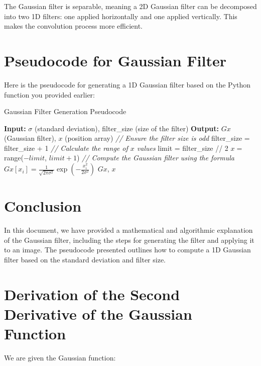 \documentclass{article}
\begin{document}
The Gaussian filter is separable, meaning a 2D Gaussian filter can be decomposed into two 1D filters: one applied horizontally and one applied vertically. This makes the convolution process more efficient.

\section{Pseudocode for Gaussian Filter}

Here is the pseudocode for generating a 1D Gaussian filter based on the Python function you provided earlier:

\begin{algorithm}
\caption{Gaussian Filter Generation Pseudocode}
\begin{algorithmic}[1]
    \State \textbf{Input:} $\sigma$ (standard deviation), filter\_size (size of the filter)
    \State \textbf{Output:} $Gx$ (Gaussian filter), $x$ (position array)
    \State
    \State \textit{// Ensure the filter size is odd}
        \State filter\_size = filter\_size + 1
    \EndIf
    \State
    \State \textit{// Calculate the range of $x$ values}
    \State limit = filter\_size // 2
    \State $x = $ range($-limit$, $limit + 1$)
    \State
    \State \textit{// Compute the Gaussian filter using the formula}
        \State $Gx[x_i] = \frac{1}{\sqrt{2 \pi \sigma^2}} \exp\left(-\frac{x_i^2}{2 \sigma^2}\right)$
    \EndFor
    \State
    \State \Return $Gx$, $x$
\EndProcedure
\end{algorithmic}
\end{algorithm}

\section{Conclusion}

In this document, we have provided a mathematical and algorithmic explanation of the Gaussian filter, including the steps for generating the filter and applying it to an image. The pseudocode presented outlines how to compute a 1D Gaussian filter based on the standard deviation and filter size.

\section*{Derivation of the Second Derivative of the Gaussian Function}

We are given the Gaussian function:
\end{document}
